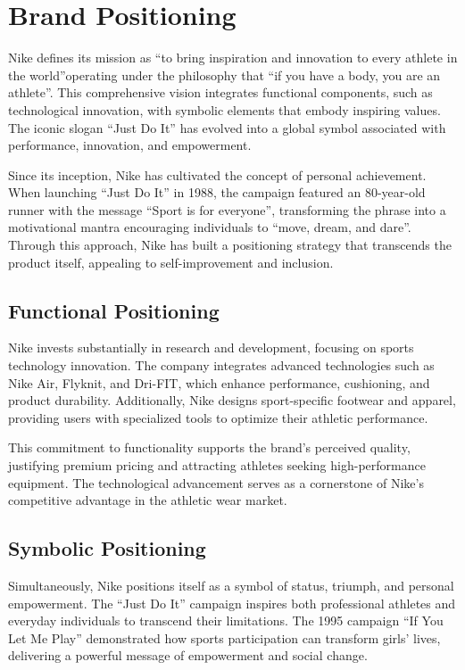 \documentclass[letterpaper, 12pt]{article}
\begin{document}
\section{Brand Positioning}

Nike defines its mission as ``to bring inspiration and innovation to every athlete in the world''operating under the philosophy that ``if you have a body, you are an athlete''. This comprehensive vision integrates functional components, such as technological innovation, with symbolic elements that embody inspiring values. The iconic slogan ``Just Do It'' has evolved into a global symbol associated with performance, innovation, and empowerment.

Since its inception, Nike has cultivated the concept of personal achievement. When launching ``Just Do It'' in 1988, the campaign featured an 80-year-old runner with the message ``Sport is for everyone'', transforming the phrase into a motivational mantra encouraging individuals to ``move, dream, and dare''. Through this approach, Nike has built a positioning strategy that transcends the product itself, appealing to self-improvement and inclusion.

\subsection{Functional Positioning}

Nike invests substantially in research and development, focusing on sports technology innovation. The company integrates advanced technologies such as Nike Air, Flyknit, and Dri-FIT, which enhance performance, cushioning, and product durability. Additionally, Nike designs sport-specific footwear and apparel, providing users with specialized tools to optimize their athletic performance.

This commitment to functionality supports the brand's perceived quality, justifying premium pricing and attracting athletes seeking high-performance equipment. The technological advancement serves as a cornerstone of Nike's competitive advantage in the athletic wear market.

\subsection{Symbolic Positioning}

Simultaneously, Nike positions itself as a symbol of status, triumph, and personal empowerment. The ``Just Do It'' campaign inspires both professional athletes and everyday individuals to transcend their limitations. The 1995 campaign ``If You Let Me Play'' demonstrated how sports participation can transform girls' lives, delivering a powerful message of empowerment and social change.
\end{document}
